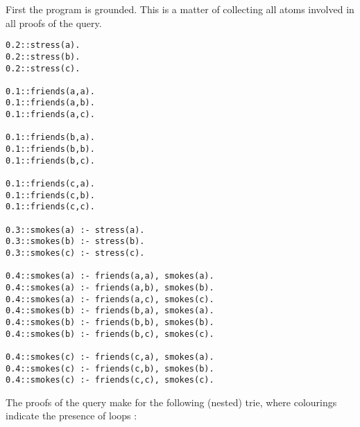


First the program is grounded. This is a matter of collecting all atoms involved in all proofs of the query.

\begin{code}
\begin{multicols}{2}
\begin{verbatim}
0.2::stress(a).
0.2::stress(b).
0.2::stress(c).

0.1::friends(a,a).
0.1::friends(a,b).
0.1::friends(a,c).

0.1::friends(b,a).
0.1::friends(b,b).
0.1::friends(b,c).

0.1::friends(c,a).
0.1::friends(c,b).
0.1::friends(c,c).

0.3::smokes(a) :- stress(a).
0.3::smokes(b) :- stress(b).
0.3::smokes(c) :- stress(c).

0.4::smokes(a) :- friends(a,a), smokes(a).
0.4::smokes(a) :- friends(a,b), smokes(b).
0.4::smokes(a) :- friends(a,c), smokes(c).
0.4::smokes(b) :- friends(b,a), smokes(a).
0.4::smokes(b) :- friends(b,b), smokes(b).
0.4::smokes(b) :- friends(b,c), smokes(c).

0.4::smokes(c) :- friends(c,a), smokes(a).
0.4::smokes(c) :- friends(c,b), smokes(b).
0.4::smokes(c) :- friends(c,c), smokes(c).
\end{verbatim}
\end{multicols}
\label{code:base}
\vspace{0.5cm}
\end{code}

\noindent The proofs of the query make for the following (nested) trie, where colourings indicate the presence of loops :

